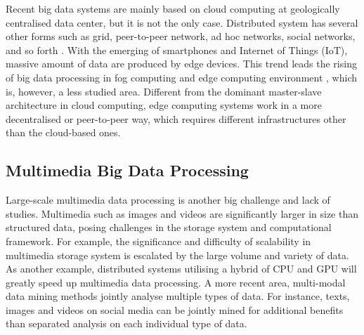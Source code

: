 \documentclass[conference]{IEEEtran}
\begin{document}
Recent big data systems are mainly based on cloud computing at
geologically centralised data center, but it is not the only case.
Distributed system has several other forms such as grid, peer-to-peer
network, ad hoc networks, social networks, and so forth
\autocite{gan2017}. With the emerging of smartphones and Internet of
Things (IoT), massive amount of data are produced by edge devices. This
trend leads the rising of big data processing in fog computing and edge
computing environment \autocite{singh_fog_2019}, which is, however, a
less studied area. Different from the dominant master-slave architecture
in cloud computing, edge computing systems work in a more decentralised
or peer-to-peer way, which requires different infrastructures other than
the cloud-based ones.

\hypertarget{multimedia-big-data-processing}{%
\subsection{Multimedia Big Data
Processing}\label{multimedia-big-data-processing}}

Large-scale multimedia data processing \autocite{Pouyanfar2018} is
another big challenge and lack of studies. Multimedia such as images and
videos are significantly larger in size than structured data, posing
challenges in the storage system and computational framework. For
example, the significance and difficulty of scalability in multimedia
storage system is escalated by the large volume and variety of data. As
another example, distributed systems utilising a hybrid of CPU and GPU
will greatly speed up multimedia data processing. A more recent area,
multi-modal data mining methods jointly analyse multiple types of data.
For instance, texts, images and videos on social media can be jointly
mined for additional benefits than separated analysis on each individual
type of data.

% 

\printbibliography
\end{document}
